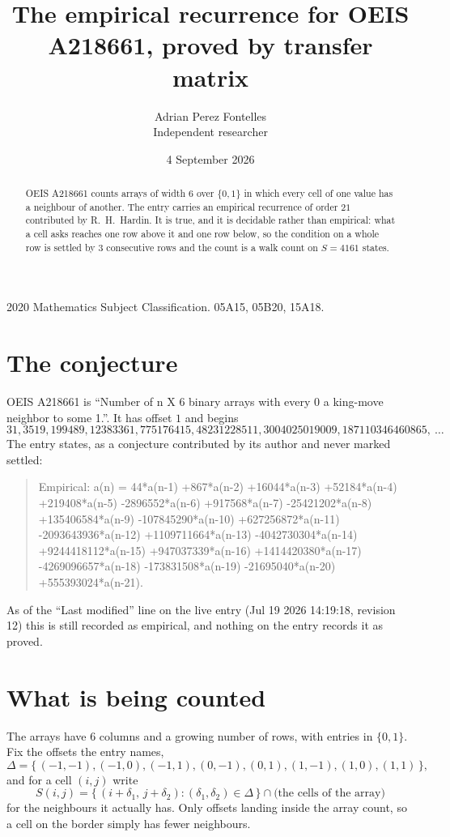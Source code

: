 \documentclass[11pt,a4paper]{article}
\title{The empirical recurrence for OEIS A218661, proved by transfer matrix}
\author{Adrian Perez Fontelles\\ \small Independent researcher}
\date{4 September 2026}
\theoremstyle{plain}
\theoremstyle{definition}
\begin{document}
\maketitle

\begin{abstract}
OEIS A218661 counts arrays of width $6$ over $\{0,1\}$ in which every cell of one value has a neighbour of another. The entry carries an
empirical recurrence of order $21$ contributed by R.~H.~Hardin. It is true, and it is
decidable rather than empirical: what a cell asks reaches one row above it and one row below, so the
condition on a whole row is settled by $3$ consecutive rows and the count is a walk
count on $S=4161$ states.
\end{abstract}

\noindent\small 2020 Mathematics Subject Classification. 05A15, 05B20, 15A18.\normalsize

\section{The conjecture}

OEIS A218661 is ``Number of n X 6 binary arrays with every 0 a king-move neighbor to some 1.''. It has offset $1$ and begins
\[
31, 3519, 199489, 12383361, 775176415, 48231228511, 3004025019009, 187110346460865,\ \dots
\]
The entry states, as a conjecture contributed by its author and never marked settled:
\begin{quote}
Empirical: a(n) = 44*a(n-1) +867*a(n-2) +16044*a(n-3) +52184*a(n-4) +219408*a(n-5) -2896552*a(n-6) +917568*a(n-7) -25421202*a(n-8) +135406584*a(n-9) -107845290*a(n-10) +627256872*a(n-11) -2093643936*a(n-12) +1109711664*a(n-13) -4042730304*a(n-14) +9244418112*a(n-15) +947037339*a(n-16) +1414420380*a(n-17) -4269096657*a(n-18) -173831508*a(n-19) -21695040*a(n-20) +555393024*a(n-21).
\end{quote}
As of the ``Last modified'' line on the live entry (Jul 19 2026 14:19:18, revision 12) this is still
recorded as empirical, and nothing on the entry records it as proved.

\section{What is being counted}

The arrays have $6$ columns and a growing number of rows, with entries in $\{0,1\}$. Fix the
offsets the entry names,
\[
\Delta=\{\,(-1,-1), (-1,0), (-1,1), (0,-1), (0,1), (1,-1), (1,0), (1,1)\,\},
\]
and for a cell $(i,j)$ write
\[
S(i,j)=\{\,(i+\delta_1,\,j+\delta_2) : (\delta_1,\delta_2)\in\Delta\,\}\cap
\text{(the cells of the array)}
\]
for the neighbours it actually has. Only offsets landing inside the array count, so a cell on
the border simply has fewer neighbours.
\end{document}
